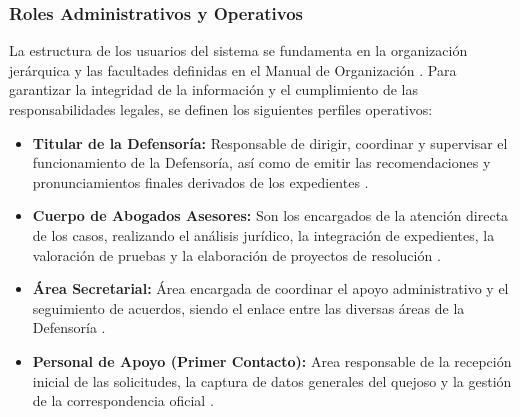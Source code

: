 \documentclass[12pt, letterpaper]{article}
\begin{document}
\subsubsection{Roles Administrativos y Operativos}
La estructura de los usuarios del sistema se fundamenta en la organización jerárquica y las facultades definidas en el Manual de Organización \cite{ipn_manual_organizacion}. Para garantizar la integridad de la información y el cumplimiento de las responsabilidades legales, se definen los siguientes perfiles operativos:
\\
\begin{itemize}
    \item \textbf{Titular de la Defensoría:} Responsable de dirigir, coordinar y supervisar el funcionamiento de la Defensoría, así como de emitir las recomendaciones y pronunciamientos finales derivados de los expedientes \cite{ipn_manual_organizacion}.
    \item \textbf{Cuerpo de Abogados Asesores:} Son los encargados de la atención directa de los casos, realizando el análisis jurídico, la integración de expedientes, la valoración de pruebas y la elaboración de proyectos de resolución \cite{ipn_manual_organizacion}.
    \item \textbf{Área Secretarial:} Área encargada de coordinar el apoyo administrativo y el seguimiento de acuerdos, siendo el enlace entre las diversas áreas de la Defensoría \cite{ipn_manual_organizacion}.
    \item \textbf{Personal de Apoyo (Primer Contacto):}
    Area responsable de la recepción inicial de las solicitudes, la captura de datos generales del quejoso y la gestión de la correspondencia oficial \cite{ipn_manual_organizacion}.
\end{itemize}
\end{document}
